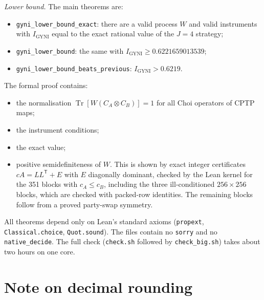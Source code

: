\documentclass[aps,pra,onecolumn,notitlepage,superscriptaddress,longbibliography,nofootinbib,11pt]{revtex4-2}
\theoremstyle{remark}
\newcommand{\Tr}{\operatorname{Tr}}
\newcommand{\tp}{\mathsf{T}}
\newcommand{\Igy}{I_{\mathrm{GYNI}}}
\newcommand{\file}[1]{\texttt{#1}}
\begin{document}
\emph{Lower bound.} The main theorems are:
\begin{itemize}
\item \texttt{gyni\_lower\_bound\_exact}: there are a valid process $W$ and valid instruments with $\Igy$ equal to the exact rational value of the $J=4$ strategy;
\item \texttt{gyni\_lower\_bound}: the same with $\Igy\ge0.6221659013539$;
\item \texttt{gyni\_lower\_bound\_beats\_previous}: $\Igy>0.6219$.
\end{itemize}
The formal proof contains:
\begin{itemize}
\item the normalisation $\Tr[W(C_A\otimes C_B)]=1$ for all Choi operators of CPTP maps;
\item the instrument conditions;
\item the exact value;
\item positive semidefiniteness of $W$. This is shown by exact integer certificates $cA=LL^{\tp}+E$ with $E$ diagonally dominant, checked by the Lean kernel for the 351 blocks with $c_A\le c_B$, including the three ill-conditioned $256\times256$ blocks, which are checked with packed-row identities. The remaining blocks follow from a proved party-swap symmetry.
\end{itemize}
All theorems depend only on Lean's standard axioms (\texttt{propext}, \texttt{Classical.choice}, \texttt{Quot.sound}). The files contain no \texttt{sorry} and no \texttt{native\_decide}. The full check (\file{check.sh} followed by \file{check\_big.sh}) takes about two hours on one core.

\section{Note on decimal rounding}\label{sec:erratum}
\end{document}
